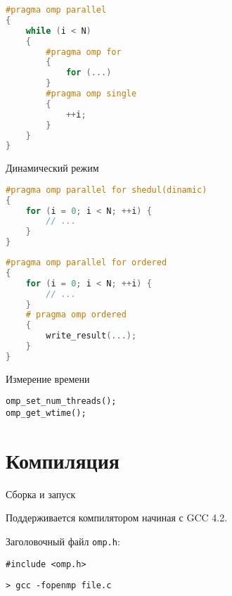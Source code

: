 \begin{frame}[fragile]

\begin{lstlisting}[language=C++,basicstyle=\ttfamily,keywordstyle=\color{blue},basicstyle=\scriptsize]
#pragma omp parallel
{
    while (i < N)
    {
        #pragma omp for
        {
            for (...)
        }
        #pragma omp single
        {
            ++i;
        }
    }
}
\end{lstlisting}

\end{frame}

\begin{frame}[fragile]{Динамический режим}

\begin{lstlisting}[language=C++,basicstyle=\ttfamily,keywordstyle=\color{blue},basicstyle=\scriptsize]
#pragma omp parallel for shedul(dinamic)
{
    for (i = 0; i < N; ++i) {
        // ...
    }
}
\end{lstlisting}

\end{frame}

\begin{frame}[fragile]

\begin{lstlisting}[language=C++,basicstyle=\ttfamily,keywordstyle=\color{blue},basicstyle=\scriptsize]
#pragma omp parallel for ordered
{
    for (i = 0; i < N; ++i) {
        // ...
    }
    # pragma omp ordered
    {
        write_result(...);
    }
}
\end{lstlisting}

\end{frame}

\begin{frame}[fragile]{Измерение времени}

\begin{lstlisting}
omp_set_num_threads();
omp_get_wtime();
\end{lstlisting}

\end{frame}

\section{Компиляция}

\begin{frame}[fragile]{Сборка и запуск}

Поддерживается компилятором начиная с GCC 4.2.

Заголовочный файл \texttt{omp.h}:

\begin{lstlisting}
#include <omp.h>
\end{lstlisting}

\begin{lstlisting}
> gcc -fopenmp file.c
\end{lstlisting}

\end{frame}

